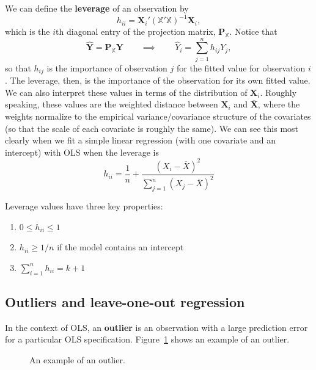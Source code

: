 \documentclass[
  13pt,
  letterpaper,
  DIV=11,
  numbers=noendperiod]{scrreprt}
\providecommand{\tightlist}{%
  \setlength{\itemsep}{0pt}\setlength{\parskip}{0pt}}\usepackage{longtable,booktabs,array}
\newcommand{\mb}{\symbf}
\newcommand{\X}{\mb{X}}
\newcommand{\Xmat}{\mathbb{X}}
\theoremstyle{plain}
\theoremstyle{definition}
\theoremstyle{definition}
\theoremstyle{remark}
\begin{document}
We can define the \textbf{leverage} of an observation by \[ 
h_{ii} = \X_{i}'\left(\Xmat'\Xmat\right)^{-1}\X_{i},
\] which is the \(i\)th diagonal entry of the projection matrix,
\(\mb{P}_{\Xmat}\). Notice that \[ 
\widehat{\mb{Y}} = \mb{P}_{\Xmat}\mb{Y} \qquad \implies \qquad \widehat{Y}_i = \sum_{j=1}^n h_{ij}Y_j,
\] so that \(h_{ij}\) is the importance of observation \(j\) for the
fitted value for observation \(i\). The leverage, then, is the
importance of the observation for its own fitted value. We can also
interpret these values in terms of the distribution of \(\X_{i}\).
Roughly speaking, these values are the weighted distance between
\(\X_i\) and \(\overline{\X}\), where the weights normalize to the
empirical variance/covariance structure of the covariates (so that the
scale of each covariate is roughly the same). We can see this most
clearly when we fit a simple linear regression (with one covariate and
an intercept) with OLS when the leverage is \[ 
h_{ii} = \frac{1}{n} + \frac{(X_i - \overline{X})^2}{\sum_{j=1}^n (X_j - \overline{X})^2}
\]

Leverage values have three key properties:

\begin{enumerate}
\def\labelenumi{\arabic{enumi}.}
\tightlist
\item
  \(0 \leq h_{ii} \leq 1\)
\item
  \(h_{ii} \geq 1/n\) if the model contains an intercept
\item
  \(\sum_{i=1}^{n} h_{ii} = k + 1\)
\end{enumerate}

\subsection{Outliers and leave-one-out
regression}\label{outliers-and-leave-one-out-regression}

In the context of OLS, an \textbf{outlier} is an observation with a
large prediction error for a particular OLS specification.
Figure~\ref{fig-outlier} shows an example of an outlier.

\begin{figure}[th]


\caption{\label{fig-outlier}An example of an outlier.}

\end{figure}%
\end{document}
